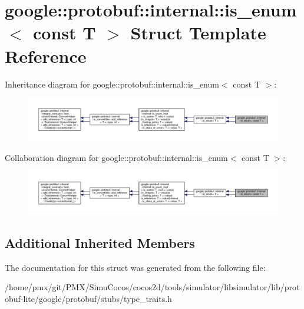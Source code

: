 \hypertarget{structgoogle_1_1protobuf_1_1internal_1_1is__enum_3_01const_01T_01_4}{}\section{google\+:\+:protobuf\+:\+:internal\+:\+:is\+\_\+enum$<$ const T $>$ Struct Template Reference}
\label{structgoogle_1_1protobuf_1_1internal_1_1is__enum_3_01const_01T_01_4}


Inheritance diagram for google\+:\+:protobuf\+:\+:internal\+:\+:is\+\_\+enum$<$ const T $>$\+:
\nopagebreak
\begin{figure}[H]
\begin{center}
\leavevmode
\includegraphics[width=350pt]{structgoogle_1_1protobuf_1_1internal_1_1is__enum_3_01const_01T_01_4__inherit__graph}
\end{center}
\end{figure}


Collaboration diagram for google\+:\+:protobuf\+:\+:internal\+:\+:is\+\_\+enum$<$ const T $>$\+:
\nopagebreak
\begin{figure}[H]
\begin{center}
\leavevmode
\includegraphics[width=350pt]{structgoogle_1_1protobuf_1_1internal_1_1is__enum_3_01const_01T_01_4__coll__graph}
\end{center}
\end{figure}
\subsection*{Additional Inherited Members}


The documentation for this struct was generated from the following file\+:\begin{DoxyCompactItemize}
\item 
/home/pmx/git/\+P\+M\+X/\+Simu\+Cocos/cocos2d/tools/simulator/libsimulator/lib/protobuf-\/lite/google/protobuf/stubs/type\+\_\+traits.\+h\end{DoxyCompactItemize}

